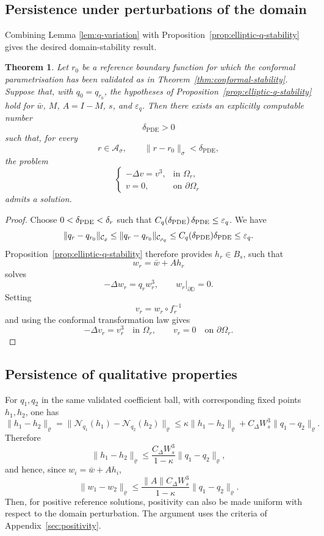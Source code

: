 \documentclass[11pt,a4paper]{amsart}
\newtheorem{theorem}{Theorem}[section]
\begin{document}
\subsection{Persistence under perturbations of the domain}

Combining Lemma \ref{lem:q-variation} with
Proposition~\ref{prop:elliptic-q-stability} gives the desired
domain-stability result.

\begin{theorem}\label{thm:elliptic-domain-persistence}
	Let $r_0$ be a reference boundary function for which the conformal
	parametrisation has been validated as in
	Theorem~\ref{thm:conformal-stability}.
	Suppose that, with $q_0=q_{r_0}$, the hypotheses of
	Proposition~\ref{prop:elliptic-q-stability} hold for
	$\bar w$, $M$, $A=I-M$, $s$, and $\varepsilon_q$.
	Then there exists an explicitly computable number
	\[
	\delta_{\mathrm{PDE}}>0
	\]
	such that, for every
	\[
	r\in\mathcal A_\sigma,
	\qquad
	\|r-r_0\|_\sigma<\delta_{\mathrm{PDE}},
	\]
	the problem
	\[
	\begin{cases}
		-\Delta v=v^3,&\text{in }\Omega_r,\\
		v=0,&\text{on }\partial\Omega_r
	\end{cases}
	\]
	admits a solution.
\end{theorem}
\begin{proof}
	Choose $0<\delta_{\rm PDE}<\delta_r$ such that $C_q(\delta_{\rm PDE})\,\delta_{\rm PDE}\le\varepsilon_q$. We have
\[
\|q_r-q_{r_0}\|_{\mathcal C_\varrho}
\le
\|q_r-q_{r_0}\|_{\mathcal C_{\rho_q}}
\le
C_q(\delta_{\rm PDE})\delta_{\rm PDE}
\le\varepsilon_q.
\]
Proposition~\ref{prop:elliptic-q-stability} therefore provides \(h_r\in B_s\), such that
\[
w_r=\bar w+Ah_r
\]
solves
\[
-\Delta w_r=q_rw_r^3,\qquad w_r|_{\partial \mathbb D}=0.
\]
Setting
\[
v_r=w_r\circ f_r^{-1}
\]
and using the conformal transformation law gives
\[
-\Delta v_r=v_r^3\quad\text{in }\Omega_r,
\qquad v_r=0\quad\text{on }\partial\Omega_r.
\]
\end{proof}

\subsection{Persistence of qualitative properties}

For \(q_1,q_2\) in the same validated coefficient ball, with corresponding fixed points \(h_1,h_2\), one has
\[
	\|h_1-h_2\|_\varrho=
	\|\mathcal N_{q_1}(h_1)-\mathcal N_{q_2}(h_2)\|_\varrho\le
	\kappa\|h_1-h_2\|_\varrho+C_\Delta W_s^3\|q_1-q_2\|_\varrho.
\]
Therefore
\[
\|h_1-h_2\|_\varrho
\le
\frac{C_\Delta W_s^3}{1-\kappa}
\|q_1-q_2\|_\varrho,
\]
and hence, since \(w_i=\bar w+Ah_i\),
\[
	\|w_1-w_2\|_\varrho
	\le
	\frac{\|A\|C_\Delta W_s^3}{1-\kappa}
	\|q_1-q_2\|_\varrho .
\]
Then, for positive reference solutions, positivity can also be made uniform
with respect to the domain perturbation. The argument uses the
criteria of Appendix~\ref{sec:positivity}.
\end{document}
